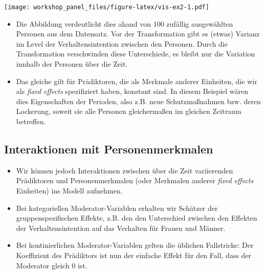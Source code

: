 \documentclass[]{book}
\newenvironment{Shaded}{\begin{snugshade}}{\end{snugshade}}
\newcommand{\DataTypeTok}[1]{\textcolor[rgb]{0.13,0.29,0.53}{#1}}
\newcommand{\DecValTok}[1]{\textcolor[rgb]{0.00,0.00,0.81}{#1}}
\newcommand{\KeywordTok}[1]{\textcolor[rgb]{0.13,0.29,0.53}{\textbf{#1}}}
\newcommand{\NormalTok}[1]{#1}
\newcommand{\OperatorTok}[1]{\textcolor[rgb]{0.81,0.36,0.00}{\textbf{#1}}}
\newcommand{\StringTok}[1]{\textcolor[rgb]{0.31,0.60,0.02}{#1}}
\providecommand{\tightlist}{%
  \setlength{\itemsep}{0pt}\setlength{\parskip}{0pt}}
\begin{document}
\texttt{[image: workshop\_panel\_files/figure-latex/vis-ex2-1.pdf]}

\begin{itemize}
\item
  Die Abbildung verdeutlicht dies ahand von 100 zufällig ausgewählten Personen aus dem Datensatz. Vor der Transformation gibt es (etwas) Varianz im Level der Verhaltensintention zwischen den Personen. Durch die Transformation verschwinden diese Unterschiede, es bleibt nur die Variation innhalb der Personen über die Zeit.
\item
  Das gleiche gilt für Prädiktoren, die als Merkmale anderer Einheiten, die wir als \emph{fixed effects} spezifiziert haben, konstant sind. In diesem Beispiel wären dies Eigenschaften der Perioden, also z.B. neue Schutzmaßnahmen bzw. deren Lockerung, soweit sie alle Personen gleichermaßen im gleichen Zeitraum betreffen.
\end{itemize}

\hypertarget{interaktionen-mit-personenmerkmalen}{%
\subsection{Interaktionen mit Personenmerkmalen}\label{interaktionen-mit-personenmerkmalen}}

\begin{itemize}
\tightlist
\item
  Wir können jedoch Interaktionen zwischen über die Zeit variierenden Prädiktoren und Personenmerkmalen (oder Merkmalen anderer \emph{fixed effects} Einheiten) ins Modell aufnehmen.
\item
  Bei kategoriellen Moderator-Variablen erhalten wir Schätzer der gruppenspezifischen Effekte, z.B. den den Unterschied zwischen den Effekten der Verhaltensintention auf das Verhalten für Frauen und Männer.
\item
  Bei kontinierlichen Moderator-Variablen gelten die üblichen Fallstricke: Der Koeffizient des Prädiktors ist nun der einfache Effekt für den Fall, dass der Moderator gleich 0 ist.
\end{itemize}

\begin{Shaded}
\end{Shaded}
\end{document}
